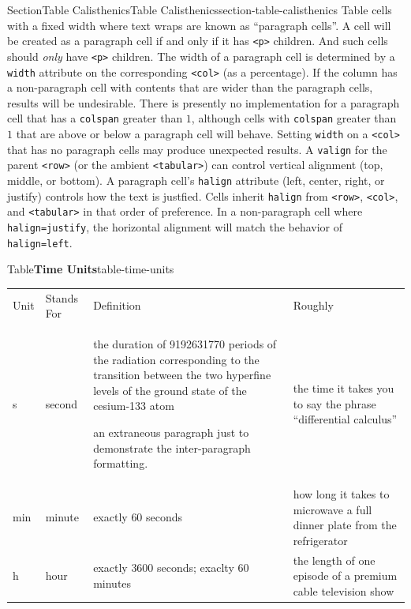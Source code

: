 \documentclass[twoside,10pt,]{article}
\newcommand{\tabularfont}{\relax}
\newcommand{\mono}[1]{\texttt{#1}}
\numberwithin{equation}{section}
\newcommand{\hrulethin}  {\noalign{\hrule height 0.04em}}
\newcommand{\hrulemedium}{\noalign{\hrule height 0.07em}}
\newcommand{\hrulethick} {\noalign{\hrule height 0.11em}}
\begin{document}
\begin{sectionptx}{Section}{Table Calisthenics}{}{Table Calisthenics}{}{}{section-table-calisthenics}
Table cells with a fixed width where text wraps are known as ``paragraph cells''. A cell will be created as a paragraph cell if and only if it has \mono{<p>} children. And such cells should \emph{only} have \mono{<p>} children. The width of a paragraph cell is determined by a \mono{width} attribute on the corresponding \mono{<col>} (as a percentage). If the column has a non-paragraph cell with contents that are wider than the paragraph cells, results will be undesirable. There is presently no implementation for a paragraph cell that has a \mono{colspan} greater than \(1\), although cells with \mono{colspan} greater than \(1\) that are above or below a paragraph cell will behave. Setting \mono{width} on a \mono{<col>} that has no paragraph cells may produce unexpected results. A \mono{valign} for the parent \mono{<row>} (or the ambient \mono{<tabular>}) can control vertical alignment (top, middle, or bottom). A paragraph cell's \mono{halign} attribute (left, center, right, or justify) controls how the text is justfied. Cells inherit \mono{halign} from \mono{<row>}, \mono{<col>}, and \mono{<tabular>} in that order of preference. In a non-paragraph cell where \mono{halign=\textquotesingle{}justify\textquotesingle{}}, the horizontal alignment will match the behavior of \mono{halign=\textquotesingle{}left\textquotesingle{}}.%
\begin{tableptx}{Table}{\textbf{Time Units}}{table-time-units}{}%
\centering%
{\tabularfont%
\begin{tabular}{llll}\hrulethick
Unit&Stands For&Definition&Roughly\tabularnewline\hrulemedium
\si{\second}&second&\multicolumn{1}{p{0.4\linewidth}}{\raggedright\setlength{\parskip}{0.5\baselineskip}%
the duration of \num{9192631770} periods of the radiation corresponding to the transition between the two hyperfine levels of the ground state of the cesium-133 atom%
\par
an extraneous paragraph just to demonstrate the inter-paragraph formatting.%
}&\multicolumn{1}{p{0.25\linewidth}}{\raggedright%
the time it takes you to say the phrase ``differential calculus''%
}\tabularnewline\hrulethin
\si{\minute}&minute&\multicolumn{1}{p{0.4\linewidth}}{\raggedright%
exactly \(60\) seconds%
}&\multicolumn{1}{p{0.25\linewidth}}{\raggedright%
how long it takes to microwave a full dinner plate from the refrigerator%
}\tabularnewline\hrulethin
\si{\hour}&hour&\multicolumn{1}{p{0.4\linewidth}}{\raggedright%
exactly \(3600\) seconds; exaclty \(60\) minutes%
}&\multicolumn{1}{p{0.25\linewidth}}{\raggedright%
the length of one episode of a premium cable television show%
}
\end{tabular}}
\end{tableptx}
\end{sectionptx}
\end{document}
